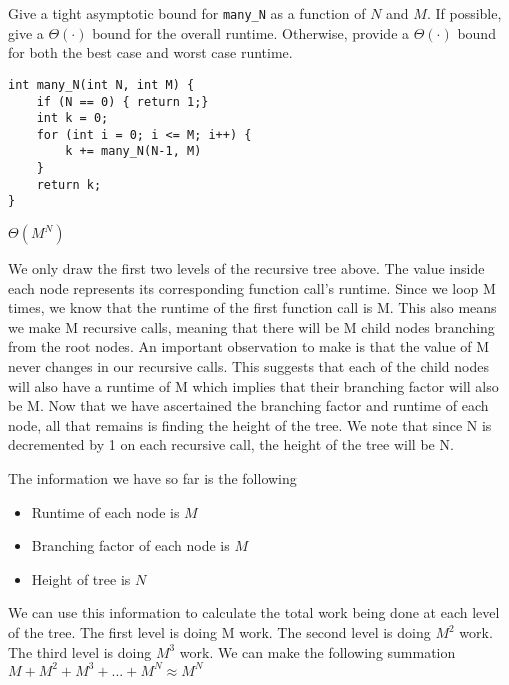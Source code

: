 \begin{blocksection}
\question Give a tight asymptotic bound for \lstinline$many_N$ as a
function of $N$ and $M$. If possible, give a $\Theta(\cdot)$ bound for the overall
runtime. Otherwise, provide a $\Theta(\cdot)$ bound for both the best case and
worst case runtime.

\begin{lstlisting}
int many_N(int N, int M) {
    if (N == 0) { return 1;}
    int k = 0;
    for (int i = 0; i <= M; i++) {
        k += many_N(N-1, M)
    }
    return k;
}
\end{lstlisting}

\begin{solution}[0.5in]
$\Theta(M^N)$
\begin{center}
\end{center}

We only draw the first two levels of the recursive tree above. The value inside each node represents its corresponding function call's runtime. Since we loop M times, we know that the runtime of the first function call is M. This also means we make M recursive calls, meaning that there will be M child nodes branching from the root nodes. An important observation to make is that the value of M never changes in our recursive calls. This suggests that each of the child nodes will also have a runtime of M which implies that their branching factor will also be M. Now that we have ascertained the branching factor and runtime of each node, all that remains is finding the height of the tree. We note that since N is decremented by 1 on each recursive call, the height of the tree will be N.

The information we have so far is the following
\begin{itemize}
    \item Runtime of each node is $M$
    \item Branching factor of each node is $M$
    \item Height of tree is $N$
\end{itemize}

We can use this information to calculate the total work being done at each level of the tree. The first level is doing M work. The second level is doing $M^2$ work. The third level is doing $M^3$ work. We can make the following summation 
$M + M^2 + M^3 + ... + M^N \approx M^N$


\end{solution}
\end{blocksection}

